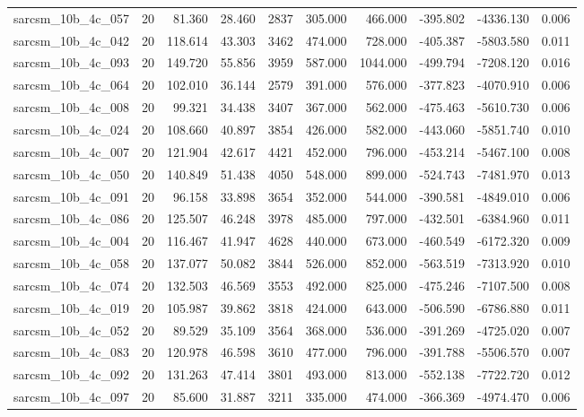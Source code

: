 \begin{tabular}{lrrrrrrrrr}
sarcsm\_10b\_4c\_057 & 20 & 81.360 & 28.460 & 2837 & 305.000 & 466.000 & -395.802 & -4336.130 & 0.006 \\
sarcsm\_10b\_4c\_042 & 20 & 118.614 & 43.303 & 3462 & 474.000 & 728.000 & -405.387 & -5803.580 & 0.011 \\
sarcsm\_10b\_4c\_093 & 20 & 149.720 & 55.856 & 3959 & 587.000 & 1044.000 & -499.794 & -7208.120 & 0.016 \\
sarcsm\_10b\_4c\_064 & 20 & 102.010 & 36.144 & 2579 & 391.000 & 576.000 & -377.823 & -4070.910 & 0.006 \\
sarcsm\_10b\_4c\_008 & 20 & 99.321 & 34.438 & 3407 & 367.000 & 562.000 & -475.463 & -5610.730 & 0.006 \\
sarcsm\_10b\_4c\_024 & 20 & 108.660 & 40.897 & 3854 & 426.000 & 582.000 & -443.060 & -5851.740 & 0.010 \\
sarcsm\_10b\_4c\_007 & 20 & 121.904 & 42.617 & 4421 & 452.000 & 796.000 & -453.214 & -5467.100 & 0.008 \\
sarcsm\_10b\_4c\_050 & 20 & 140.849 & 51.438 & 4050 & 548.000 & 899.000 & -524.743 & -7481.970 & 0.013 \\
sarcsm\_10b\_4c\_091 & 20 & 96.158 & 33.898 & 3654 & 352.000 & 544.000 & -390.581 & -4849.010 & 0.006 \\
sarcsm\_10b\_4c\_086 & 20 & 125.507 & 46.248 & 3978 & 485.000 & 797.000 & -432.501 & -6384.960 & 0.011 \\
sarcsm\_10b\_4c\_004 & 20 & 116.467 & 41.947 & 4628 & 440.000 & 673.000 & -460.549 & -6172.320 & 0.009 \\
sarcsm\_10b\_4c\_058 & 20 & 137.077 & 50.082 & 3844 & 526.000 & 852.000 & -563.519 & -7313.920 & 0.010 \\
sarcsm\_10b\_4c\_074 & 20 & 132.503 & 46.569 & 3553 & 492.000 & 825.000 & -475.246 & -7107.500 & 0.008 \\
sarcsm\_10b\_4c\_019 & 20 & 105.987 & 39.862 & 3818 & 424.000 & 643.000 & -506.590 & -6786.880 & 0.011 \\
sarcsm\_10b\_4c\_052 & 20 & 89.529 & 35.109 & 3564 & 368.000 & 536.000 & -391.269 & -4725.020 & 0.007 \\
sarcsm\_10b\_4c\_083 & 20 & 120.978 & 46.598 & 3610 & 477.000 & 796.000 & -391.788 & -5506.570 & 0.007 \\
sarcsm\_10b\_4c\_092 & 20 & 131.263 & 47.414 & 3801 & 493.000 & 813.000 & -552.138 & -7722.720 & 0.012 \\
sarcsm\_10b\_4c\_097 & 20 & 85.600 & 31.887 & 3211 & 335.000 & 474.000 & -366.369 & -4974.470 & 0.006 \\

\end{tabular}

